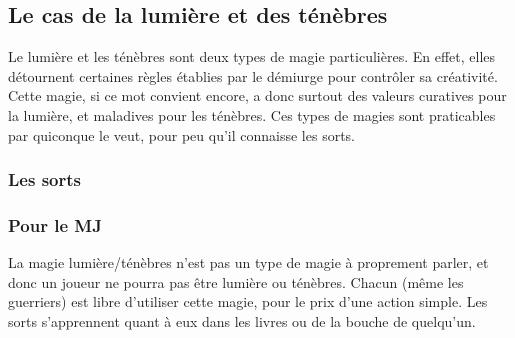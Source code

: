 \subsection{Le cas de la lumière et des ténèbres}
Le lumière et les ténèbres sont deux types de magie particulières. En effet, elles détournent certaines règles établies par le démiurge pour contrôler sa créativité. Cette magie, si ce mot convient encore, a donc surtout des valeurs curatives pour la lumière, et maladives pour les ténèbres. Ces types de magies sont praticables par quiconque le veut, pour peu qu'il connaisse les sorts.
\subsubsection{Les sorts}
\subsubsection{Pour le MJ}
La magie lumière/ténèbres n'est pas un type de magie à proprement parler, et donc un joueur ne pourra pas être lumière ou ténèbres. Chacun (même les guerriers) est libre d’utiliser cette magie, pour le prix d'une action simple.
Les sorts s’apprennent quant à eux dans les livres ou de la bouche de quelqu'un. 